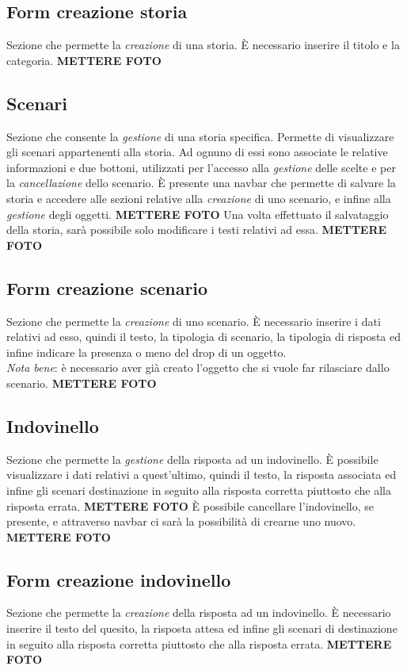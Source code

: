 \documentclass{article}
\begin{document}
\subsection*{Form creazione storia}
Sezione che permette la \textit{creazione} di una storia. È necessario inserire il titolo e la categoria.
\textbf{METTERE FOTO}

\subsection*{Scenari}
Sezione che consente la \textit{gestione} di una storia specifica. Permette di visualizzare gli scenari appartenenti alla storia. Ad ognuno di essi sono associate le relative informazioni e due bottoni, utilizzati per l'accesso alla \textit{gestione} delle scelte e per la \textit{cancellazione} dello scenario. È presente una navbar che permette di salvare la storia e accedere alle sezioni relative alla \textit{creazione} di uno scenario, e infine alla \textit{gestione} degli oggetti.
\textbf{METTERE FOTO}
Una volta effettuato il salvataggio della storia, sarà possibile solo modificare i testi relativi ad essa.
\textbf{METTERE FOTO}

\subsection*{Form creazione scenario}
Sezione che permette la \textit{creazione} di uno scenario. È necessario inserire i dati relativi ad esso, quindi il testo, la tipologia di scenario, la tipologia di risposta ed infine indicare la presenza o meno del drop di un oggetto.\vspace*{7pt}\\
\textit{Nota bene}: è necessario aver già creato l'oggetto che si vuole far rilasciare dallo scenario.
\textbf{METTERE FOTO}

\subsection*{Indovinello}
Sezione che permette la \textit{gestione} della risposta ad un indovinello. È possibile visualizzare i dati relativi a quest'ultimo, quindi il testo, la risposta associata ed infine gli scenari destinazione in seguito alla risposta corretta piuttosto che alla risposta errata. 
\textbf{METTERE FOTO}
È possibile cancellare l'indovinello, se presente, e attraverso navbar ci sarà la possibilità di crearne uno nuovo.
\textbf{METTERE FOTO}

\subsection*{Form creazione indovinello}
Sezione che permette la \textit{creazione} della risposta ad un indovinello. È necessario inserire il testo del quesito, la risposta attesa ed infine gli scenari di destinazione in seguito alla risposta corretta piuttosto che alla risposta errata. 
\textbf{METTERE FOTO}
\end{document}
